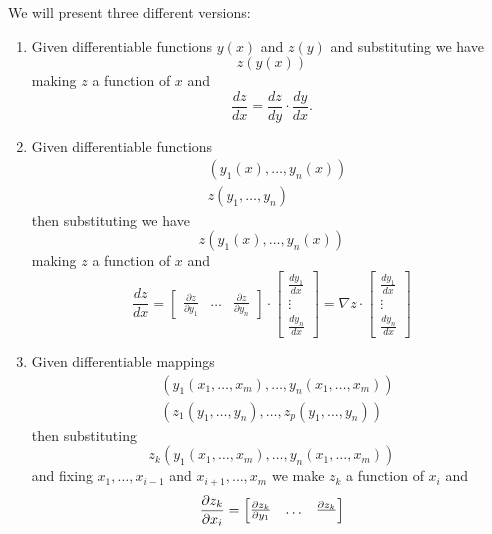 \documentclass{ximera}
\begin{document}
\begin{theorem} We will present three different versions:
  \begin{enumerate}
  \item Given differentiable functions $y(x)$ and $z(y)$
    and substituting we have%
    \[
    z\left( y\left( x\right) \right) 
    \]
    making $z$ a function of $x$ and%
    \[
      \frac{dz}{dx}=\frac{dz}{dy}\cdot\frac{dy}{dx}. 
    \]
  \item Given differentiable functions
    \begin{align*}
      & \left( y_{1}\left( x\right) ,\ldots,y_{n}\left( x\right) \right) \\
      & z\left( y_{1},\ldots,y_{n}\right)
    \end{align*}
    then substituting we have%
    \[
    z\left( y_{1}\left( x\right) ,\ldots,y_{n}\left( x\right) \right) 
    \]
    making $z$ a function of $x$ and%
    \[
      \frac{dz}{dx}=\begin{bmatrix}
      \frac{\partial z}{\partial y_{1}} & \ldots & \frac{\partial z}{\partial y_{n}
      }
      \end{bmatrix}
      \cdot\begin{bmatrix}
      \frac{dy_{1}}{dx} \\ 
      \vdots \\ 
      \frac{dy_{n}}{dx}%
      \end{bmatrix}
      =\nabla z\cdot
      \begin{bmatrix}
        \frac{dy_{1}}{dx} \\ 
        \vdots \\ 
        \frac{dy_{n}}{dx}%
      \end{bmatrix}
      \]
\item Given differentiable mappings%
  \begin{align*}
    & \left( y_{1}\left( x_{1},\ldots,x_{m}\right) ,\ldots,y_{n}\left(
    x_{1},\ldots,x_{m}\right) \right) \\
    & \left( z_{1}\left( y_{1},\ldots,y_{n}\right) ,\ldots,z_{p}\left(
    y_{1},\ldots,y_{n}\right)\right)
  \end{align*}
  then substituting 
  \[
  z_{k}\left( y_{1}\left( x_{1},\ldots,x_{m}\right) ,\ldots,y_{n}\left(
  x_{1},\ldots,x_{m}\right) \right) 
  \]
  and fixing $x_{1},\ldots,x_{i-1}$ and $x_{i+1},\ldots,x_{m}$ we make
  $z_{k}$ a function of $x_{i}$ and%
  \[
  \frac{\partial z_{k}}{\partial x_{i}}= 
  \begin{bmatrix}
    \frac{\partial z_{k}}{\partial y_{1}} & \ldots & \frac{\partial z_{k}}{%
}
\end{bmatrix}\]
\end{enumerate}
\end{theorem}
\end{document}
